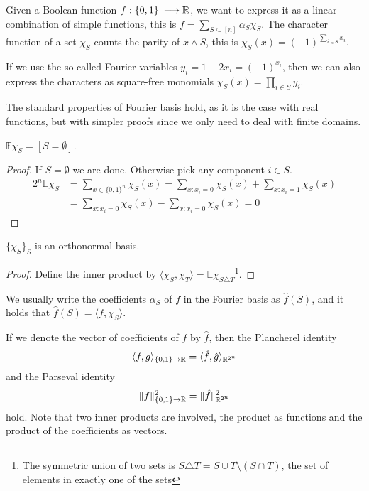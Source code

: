\documentclass[a4paper,twoside,justified]{tufte-handout}
\begin{document}
Given a Boolean function $f:\{0,1\}\:\longrightarrow \mathbb{R}$, we want to express it as a linear combination of simple functions, this is $f = \sum_{S \subseteq [n]} \alpha_S \chi_S$. The character function of a set $\chi_S$ counts the parity of $x \land S$, this is $\chi_S(x) = (-1)^{\sum_{i\in S} x_i}$.

If we use the so-called Fourier variables $y_i = 1-2x_i = (-1)^{x_i}$, then we can also express the characters as square-free monomials $\chi_S(x) = \prod_{i\in S} y_i$.

The standard properties of Fourier basis hold, as it is the case with real functions, but with simpler proofs since we only need to deal with finite domains.

\begin{lemma}
  $\mathbb{E} \chi_S = [S=\emptyset]$.
\end{lemma}
\begin{proof}
  If $S=\emptyset$ we are done. Otherwise pick any component $i\in S$.
\begin{align}
2^n \mathbb{E} \chi_S &=
\sum_{x \in \{0,1\}^n} \chi_S(x) = 
\sum_{x : x_i = 0} \chi_S(x) + \sum_{x : x_i = 1} \chi_S(x) \\ &= 
\sum_{x : x_i = 0} \chi_S(x) - \sum_{x : x_i = 0} \chi_S(x) = 0
\end{align}
\end{proof}

\begin{lemma}
  $\{\chi_S\}_S$ is an orthonormal basis.
\end{lemma}
\begin{proof}
  Define the inner product by $\langle \chi_S, \chi_T \rangle = \mathbb{E}\chi_{S \triangle T}$\footnote{The symmetric union of two sets is $S \triangle T = S \cup T \setminus (S \cap T)$, the set of elements in exactly one of the sets}.
\end{proof}

We usually write the coefficients $\alpha_S$ of $f$ in the Fourier basis as $\hat{f}(S)$, and it holds that $\hat{f}(S) = \langle f,\chi_S \rangle$.

If we denote the vector of coefficients of $f$ by $\hat f$, then the Plancherel identity
\begin{equation}\langle f,g \rangle_{\{0,1\}\to\mathbb{R}} = \langle \hat f, \hat g \rangle_{\mathbb{R}^{2^n}}\end{equation}
and the Parseval identity 
\begin{equation}
\|f\|_{\{0,1\}\to\mathbb{R}}^2=\|\hat f\|_{\mathbb{R}^{2^n}}^2
\end{equation}
hold. Note that two inner products are involved, the product as functions and the product of the coefficients as vectors.

%


\end{document}
